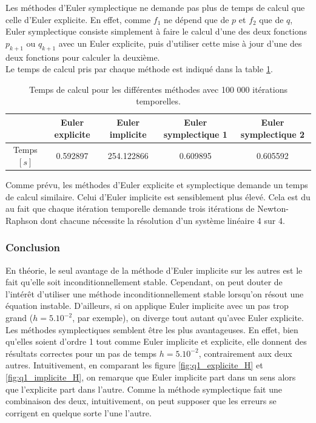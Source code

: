 
Les méthodes d'Euler symplectique ne demande pas plus de temps de calcul que celle d'Euler explicite. En effet, comme $f_1$ ne dépend que de $p$ et $f_2$ que de $q$, Euler symplectique consiste simplement à faire le calcul d'une des deux fonctions $p_{k+1}$ ou $q_{k+1}$ avec un Euler explicite, puis d'utiliser cette mise à jour d'une des deux fonctions pour calculer la deuxième. \\
Le temps de calcul pris par chaque méthode est indiqué dans la table \ref{table_time}.

\begin{table}[h]
\centering
\begin{tabular}{|c|cccc|}
\hline
 & Euler explicite & Euler implicite & Euler symplectique 1 & Euler symplectique 2 \\
\hline
Temps $[s]$ & 0.592897 & 254.122866 & 0.609895 &  0.605592\\
\hline
\end{tabular}
\caption{Temps de calcul pour les différentes méthodes avec 100 000 itérations temporelles.}
\label{table_time}
\end{table}

Comme prévu, les méthodes d'Euler explicite et symplectique demande un temps de calcul similaire. Celui d'Euler implicite est sensiblement plus élevé. Cela est du au fait que chaque itération temporelle demande trois itérations de Newton-Raphson dont chacune nécessite la résolution d'un système linéaire 4 sur 4.


\subsubsection{Conclusion} En théorie, le seul avantage de la méthode d'Euler implicite sur les autres est le fait qu'elle soit inconditionnellement stable. Cependant, on peut douter de l'intérêt d'utiliser une méthode inconditionnellement stable lorsqu'on résout une équation instable. D'ailleurs, si on applique Euler implicite avec un pas trop grand ($h=5.10^{-2}$, par exemple), on diverge tout autant qu'avec Euler explicite. \\
  Les méthodes symplectiques semblent être les plus avantageuses. En effet, bien qu'elles soient d'ordre 1 tout comme Euler implicite et explicite, elle donnent des résultats correctes pour un pas de temps $h=5.10^{-2}$, contrairement aux deux autres. Intuitivement, en comparant les figure \ref{fig:q1_explicite_H} et \ref{fig:q1_implicite_H}, on remarque que Euler implicite part dans un sens alors que l'explicite part dans l'autre. Comme la méthode symplectique fait une combinaison des deux, intuitivement, on peut supposer que les erreurs se corrigent en quelque sorte l'une l'autre.

